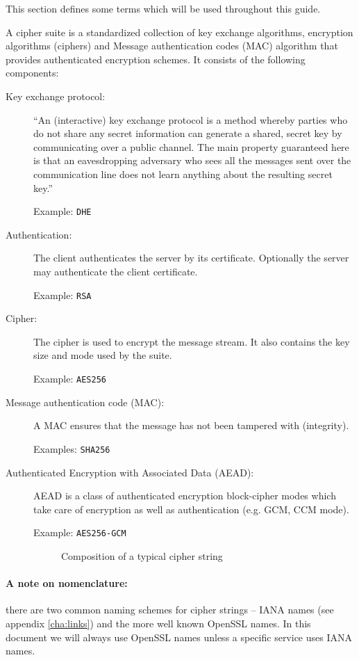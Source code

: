 
This section defines some terms which will be used throughout this guide.


A cipher suite is a standardized collection of key exchange algorithms, encryption 
algorithms (ciphers) and Message authentication codes (MAC) algorithm that provides
authenticated encryption schemes. It consists of the following components:

\begin{description}

  \item[Key exchange protocol:]
``An (interactive) key exchange protocol is a method whereby parties who do not 
share any secret information can generate a shared, secret key by communicating 
over a public channel. The main property guaranteed here is that an 
eavesdropping adversary who sees all the messages sent over the communication 
line does not learn anything about the resulting secret key.''~\cite{katz2008introduction}

Example: \texttt{DHE}

  \item[Authentication:]
The client authenticates the server by its certificate. Optionally the server 
may authenticate the client certificate.

Example: \texttt{RSA}

  \item[Cipher:]
The cipher is used to encrypt the message stream. It also contains the key size
and mode used by the suite.

Example: \texttt{AES256}

  \item[Message authentication code (MAC):]
A MAC ensures that the message has not been tampered with (integrity).

Examples: \texttt{SHA256}

  \item[Authenticated Encryption with Associated Data (AEAD):]
AEAD is a class of authenticated encryption block-cipher modes
which take care of encryption as well as authentication (e.g. GCM, CCM mode). 

Example: \texttt{AES256-GCM}



\begin{figure}[h]
\caption{Composition of a typical cipher string}
\end{figure}
\end{description}
%
\paragraph*{A note on nomenclature:} there are two common naming schemes for cipher strings -- IANA names (see appendix \ref{cha:links}) and the more well known OpenSSL names. In this document we will always use OpenSSL names unless a specific service uses IANA names.
